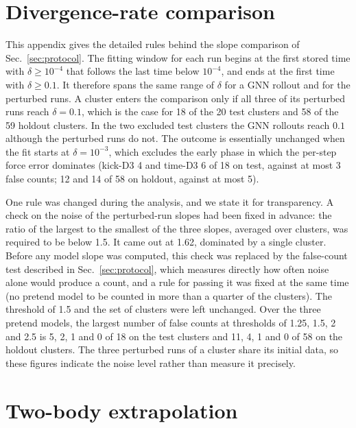 \documentclass[a4paper,journal]{IEEEtran}
\begin{document}
\section{Divergence-rate comparison}\label{app:slopes}

This appendix gives the detailed rules behind the slope comparison of Sec.~\ref{sec:protocol}. The fitting window for each run begins at the first stored time with $\delta\ge10^{-4}$ that follows the last time below $10^{-4}$, and ends at the first time with $\delta\ge0.1$. It therefore spans the same range of $\delta$ for a GNN rollout and for the perturbed runs. A cluster enters the comparison only if all three of its perturbed runs reach $\delta=0.1$, which is the case for 18 of the 20 test clusters and 58 of the 59 holdout clusters. In the two excluded test clusters the GNN rollouts reach $0.1$ although the perturbed runs do not. The outcome is essentially unchanged when the fit starts at $\delta=10^{-3}$, which excludes the early phase in which the per-step force error dominates (kick-D3 4 and time-D3 6 of 18 on test, against at most 3 false counts; 12 and 14 of 58 on holdout, against at most 5).

One rule was changed during the analysis, and we state it for transparency. A check on the noise of the perturbed-run slopes had been fixed in advance: the ratio of the largest to the smallest of the three slopes, averaged over clusters, was required to be below 1.5. It came out at 1.62, dominated by a single cluster. Before any model slope was computed, this check was replaced by the false-count test described in Sec.~\ref{sec:protocol}, which measures directly how often noise alone would produce a count, and a rule for passing it was fixed at the same time (no pretend model to be counted in more than a quarter of the clusters). The threshold of 1.5 and the set of clusters were left unchanged. Over the three pretend models, the largest number of false counts at thresholds of 1.25, 1.5, 2 and 2.5 is 5, 2, 1 and 0 of 18 on the test clusters and 11, 4, 1 and 0 of 58 on the holdout clusters. The three perturbed runs of a cluster share its initial data, so these figures indicate the noise level rather than measure it precisely.

\section{Two-body extrapolation}\label{app:twobody}
\end{document}
